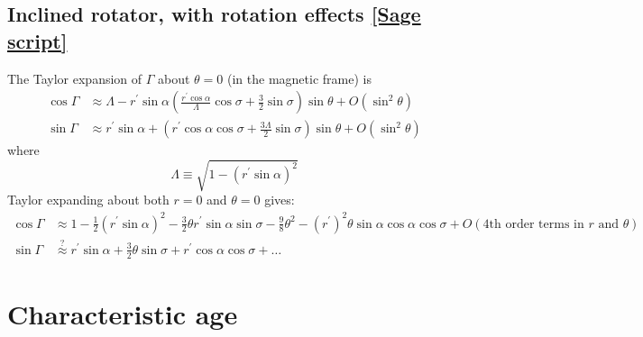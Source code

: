 \documentclass{book}
\newcommand{\linktosage}[1]{\hyperref[#1]{[Sage script]}}
\begin{document}
\subsection{Inclined rotator, with rotation effects \linktosage{sage:Gamma}}

The Taylor expansion of $\Gamma$ about $\theta = 0$ (in the magnetic frame) is
\begin{equation}
    \begin{aligned}
        \cos\Gamma &\approx \Lambda - r^\prime\sin\alpha
            \left(\frac{r^\prime\cos\alpha}{\Lambda}\cos\sigma +
                  \frac32\sin\sigma\right)\sin\theta + O(\sin^2\theta) \\
        \sin\Gamma &\approx r^\prime\sin\alpha +
            \left(r^\prime\cos\alpha\cos\sigma + \frac{3\Lambda}{2}\sin\sigma\right)\sin\theta +
            O(\sin^2\theta)
    \end{aligned}
\end{equation}
where
\begin{equation}
    \Lambda \equiv \sqrt{1-(r^\prime\sin\alpha)^2}
\end{equation}
Taylor expanding about both $r = 0$ and $\theta = 0$ gives:
\begin{equation}
    \begin{aligned}
        \cos\Gamma &\approx 1 - \frac12(r^\prime\sin\alpha)^2 -
            \frac32\theta r^\prime\sin\alpha\sin\sigma -
            \frac98\theta^2 - (r^\prime)^2\theta\sin\alpha\cos\alpha\cos\sigma +
            O(\text{4th order terms in $r$ and $\theta$}) \\
        \sin\Gamma &\stackrel{?}{\approx} r^\prime\sin\alpha + \frac32\theta\sin\sigma + r^\prime\cos\alpha\cos\sigma + \dots
    \end{aligned}
\end{equation}

\section{Characteristic age}
\end{document}
